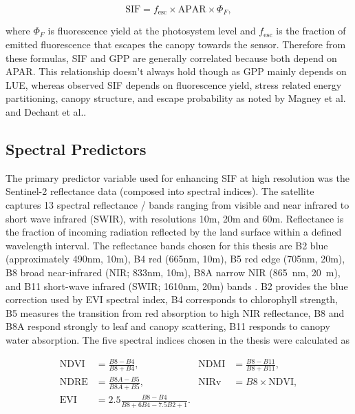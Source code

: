 \begin{equation}
\mathrm{SIF}=f_{\mathrm{esc}}\times\mathrm{APAR}\times\Phi_F,
\label{eq:sif_apar_background}
\end{equation}

where \(\Phi_F\) is fluorescence yield at the photosystem level and \(f_{\mathrm{esc}}\) is the fraction of emitted fluorescence that escapes the canopy towards the sensor. Therefore from these formulas, SIF and GPP are generally correlated because both depend on APAR. This relationship doesn't always hold though as GPP mainly depends on LUE, whereas observed SIF depends on fluorescence yield, stress related energy partitioning, canopy structure, and escape probability as noted by Magney et al. and Dechant et al.\cite{magney2020covariation,dechant2020canopy}. 

\subsection{Spectral Predictors}

The primary predictor variable used for enhancing SIF at high resolution was the Sentinel-2 reflectance data (composed into spectral indices). The satellite captures 13 spectral reflectance / bands ranging from visible and near infrared to short wave infrared (SWIR), with resolutions 10m, 20m and 60m. Reflectance is the fraction of incoming radiation reflected by the land surface within a defined wavelength interval. The reflectance bands chosen for this thesis are B2 blue (approximately 490nm, 10m), B4 red (665nm, 10m), B5 red edge (705nm, 20m), B8 broad near-infrared (NIR; 833nm, 10m), B8A narrow NIR (865~nm, 20~m), and B11 short-wave infrared (SWIR; 1610nm, 20m) bands \cite{drusch2012sentinel}. B2 provides the blue correction used by EVI spectral index, B4 corresponds to chlorophyll strength, B5 measures the transition from red absorption to high NIR reflectance, B8 and B8A respond strongly to leaf and canopy scattering, B11 responds to canopy water absorption. The five spectral indices chosen in the thesis were calculated as

\begin{align}
\mathrm{NDVI} &= \frac{B8-B4}{B8+B4},
&
\mathrm{NDMI} &= \frac{B8-B11}{B8+B11},
\label{eq:background_ndvi_ndmi}\\
\mathrm{NDRE} &= \frac{B8A-B5}{B8A+B5},
&
\mathrm{NIRv} &= B8\times\mathrm{NDVI},
\label{eq:background_ndre_nirv}\\
\mathrm{EVI} &= 2.5\frac{B8-B4}{B8+6B4-7.5B2+1}.
\label{eq:background_evi}
\end{align}

